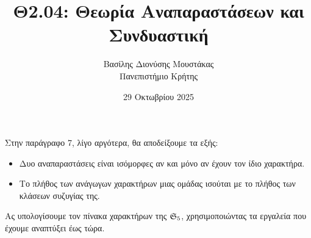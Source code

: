 \documentclass[12pt,a4paper,reqno]{amsart}
\title{Θ2.04: Θεωρία Αναπαραστάσεων και Συνδυαστική}
\author[Β.~Δ. Μουστακας]{Βασίλης Διονύσης Μουστάκας \\ Πανεπιστήμιο Κρήτης}
\date{29 Οκτωβρίου 2025}
\theoremstyle{definition}
\begin{document}
\begingroup
\def\uppercasenonmath#1{} %
\let\MakeUppercase\relax %
\maketitle
\endgroup

\thispagestyle{empty}

Στην παράγραφο 7, λίγο αργότερα, θα αποδείξουμε τα εξής:
\begin{itemize}
    \item Δυο αναπαραστάσεις είναι ισόμορφες αν και μόνο αν έχουν τον ίδιο χαρακτήρα.
    \item Το πλήθος των ανάγωγων χαρακτήρων μιας ομάδας ισούται με το πλήθος των κλά\-σεων συζυγίας της.
\end{itemize}
Ας υπολογίσουμε τον πίνακα χαρακτήρων της $\mathfrak{S}_5$, χρησιμοποιώντας τα εργαλεία που έχουμε αναπτύξει έως τώρα.
\end{document}
